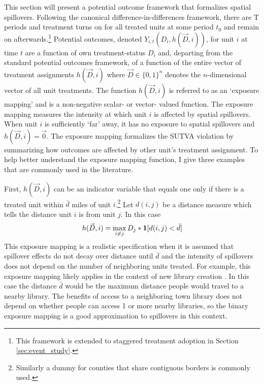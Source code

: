 \documentclass[11pt]{article}
\begin{document}
This section will present a potential outcome framework that formalizes spatial spillovers. Following the canonical difference-in-differences framework, there are T periods and treatment turns on for all treated units at some period $t_0$ and remain on afterwards.\footnote{This framework is extended to staggered treatment adoption in Section \ref{sec:event_study}.} Potential outcomes, denoted $Y_{i,t}(D_i, h(\vec{D},i))$, for unit $i$ at time $t$ are a function of own treatment-status $D_i$ and, departing from the standard potential outcomes framework, of a function of the entire vector of treatment assignments $h(\vec{D}, i)$ where $\vec{D} \in \{0,1 \}^n$ denotes the $n$-dimensional vector of all unit treatments. The function $h(\vec{D}, i)$ is referred to as an `exposure mapping' and is a non-negative scalar- or vector- valued function. The exposure mapping measures the intensity at which unit $i$ is affected by spatial spillovers. When unit $i$ is sufficiently `far' away, it has no exposure to spatial spillovers and $h(\vec{D}, i) = \vec{0}$. The exposure mapping formalizes the SUTVA violation by summarizing how outcomes are affected by other unit's treatment assignment. To help better understand the exposure mapping function, I give three examples that are commonly used in the literature.

\begin{example}
    First, $h(\vec{D}, i)$ can be an indicator variable that equals one only if there is a treated unit within $\bar{d}$ miles of unit $i$.\footnote{Similarly a dummy for counties that share contiguous borders is commonly used.} Let $d(i,j)$ be a distance measure which tells the distance unit $i$ is from unit $j$.  In this case \begin{equation}\label{eq:h_within}
        h(\vec{D}, i) = \max_{i \neq j} D_j * \mathbf{1}[ d(i,j) < \bar{d} ] 
    \end{equation}
    This exposure mapping is a realistic specification when it is assumed that spillover effects do not decay over distance until $\bar{d}$ and the intensity of spillovers does not depend on the number of neighboring units treated. For example, this exposure mapping likely applies in the context of new library creation \citep{Berkes_Nencka_2020}. In this case the distance $\bar{d}$ would be the maximum distance people would travel to a nearby library. The benefits of access to a neighboring town library does not depend on whether people can access 1 or more nearby libraries, so the binary exposure mapping is a good approximation to spillovers in this context.  
\end{example}
    
\end{document}
